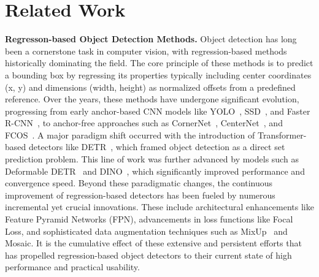\section{Related Work}
\label{sec:related_work}

\textbf{Regresson-based Object Detection Methods.}
Object detection has long been a cornerstone task in computer vision, with regression-based methods historically dominating the field. The core principle of these methods is to predict a bounding box by regressing its properties typically including center coordinates (x, y) and dimensions (width, height) as normalized offsets from a predefined reference.
Over the years, these methods have undergone significant evolution, progressing from early anchor-based CNN models like YOLO~\cite{redmon2016you}, SSD~\cite{liu2016ssd}, and Faster R-CNN~\cite{ren2016faster}, to anchor-free approaches such as CornerNet~\cite{law2018cornernet}, CenterNet~\cite{duan2019centernet}, and FCOS~\cite{tian2019fcos}. A major paradigm shift occurred with the introduction of Transformer-based detectors like DETR~\cite{carion2020end}, which framed object detection as a direct set prediction problem. This line of work was further advanced by models such as Deformable DETR~\cite{zhu2020deformable} and DINO~\cite{zhang2022dino}, which significantly improved performance and convergence speed.
Beyond these paradigmatic changes, the continuous improvement of regression-based detectors has been fueled by numerous incremental yet crucial innovations. These include architectural enhancements like Feature Pyramid Networks (FPN)\cite{lin2017feature}, advancements in loss functions like Focal Loss\cite{lin2017focal}, and sophisticated data augmentation techniques such as MixUp~\cite{zhang2017mixup} and Mosaic. It is the cumulative effect of these extensive and persistent efforts that has propelled regression-based object detectors to their current state of high performance and practical usability.

